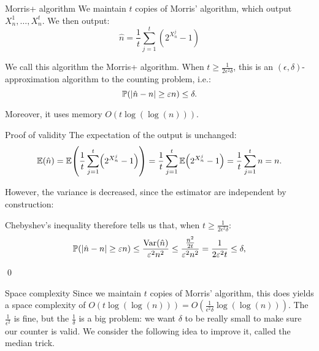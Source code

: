 \documentclass[a4paper]{article}
\begin{document}
\begin{parag}{Morris+ algorithm}
    We maintain $t$ copies of Morris' algorithm, which output $X_n^1, \ldots, X_n^t$. We then output: 
    \[\hat{n} = \frac{1}{t} \sum_{j=1}^{t} \left(2^{X_n^j} - 1\right)\]

    We call this algorithm the Morris+ algorithm. When $t \geq \frac{1}{2 \epsilon^2 \delta}$, this is an $\left(\epsilon, \delta\right)$-approximation algorithm to the counting problem, i.e.:
    \[\prob\left(\left|\hat{n} - n\right| \geq \epsilon n\right) \leq \delta.\]
    
    Moreover, it uses memory $O\left(t \log\left(\log\left(n\right)\right)\right)$.
    
    \begin{subparag}{Proof of validity}
        The expectation of the output is unchanged: 
        \[\exval\left(\hat{n}\right) = \exval\left(\frac{1}{t} \sum_{j=1}^{t} \left(2^{X_n^j} - 1\right)\right) = \frac{1}{t} \sum_{j=1}^{t} \exval\left(2^{X_n^j} - 1\right) = \frac{1}{t} \sum_{j=1}^{t} n = n.\]

        However, the variance is decreased, since the estimator are independent by construction: 
        
        Chebyshev's inequality therefore tells us that, when $t \geq \frac{1}{2 \epsilon^2 \delta}$: 
        \[\prob\left(\left|\hat{n} - n\right| \geq \epsilon n\right) \leq \frac{\Var\left(\hat{n}\right)}{\epsilon^2 n^2} \leq \frac{\frac{n^2}{2t}}{\epsilon^2 n^2} = \frac{1}{2 \epsilon^2 t} \leq \delta,\]

        \qed
    \end{subparag}

    \begin{subparag}{Space complexity}
        Since we maintain $t$ copies of Morris' algorithm, this does yields a space complexity of $O\left(t \log\left(\log\left(n\right)\right)\right) = O\left(\frac{1}{\epsilon^2 \delta} \log\left(\log\left(n\right)\right)\right)$. The $\frac{1}{\epsilon^2}$ is fine, but the $\frac{1}{\delta}$ is a big problem: we want $\delta$ to be really small to make sure our counter is valid. We consider the following idea to improve it, called the median trick.
    \end{subparag}
\end{parag}
\end{document}
